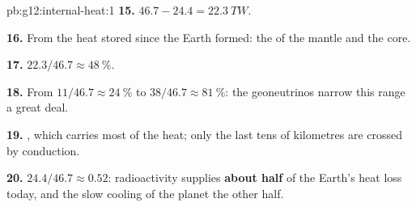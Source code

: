 \begin{solution}{pb:g12:internal-heat:1}
\textbf{15.} $46.7 - 24.4 = \qty{22.3}{TW}$.

\textbf{16.} From the heat stored since the Earth formed: the  of the mantle and the core.

\textbf{17.} $22.3/46.7 \approx \qty{48}{\percent}$.

\textbf{18.} From $11/46.7 \approx \qty{24}{\percent}$ to $38/46.7 \approx
\qty{81}{\percent}$: the geoneutrinos narrow this range a great deal.

\textbf{19.} , which carries most of the heat; only the last
tens of kilometres are crossed by conduction.

\textbf{20.} $24.4/46.7 \approx 0.52$: radioactivity supplies
\textbf{about half} of the Earth's heat loss today, and the slow cooling of
the planet the other half.
\end{solution}
